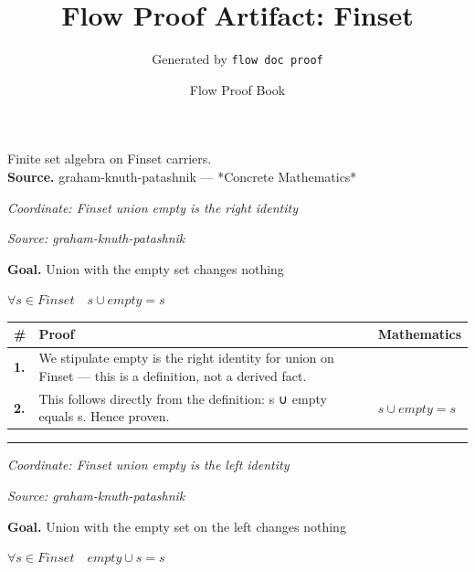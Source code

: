 \documentclass[11pt]{article}
\title{Flow Proof Artifact: Finset}
\author{Generated by \texttt{flow doc proof}}
\date{Flow Proof Book}
\theoremstyle{definition}
\begin{document}
\maketitle
Finite set algebra on Finset carriers.\\[0.5em]
\textbf{Source.} graham-knuth-patashnik — *Concrete Mathematics*\\[0.5em]
\bigskip
{}\par
\smallskip\noindent\textit{Coordinate: Finset \cdot union \cdot empty is the right identity}\par
\smallskip\noindent\textit{Source: graham-knuth-patashnik}\par
\medskip
\noindent\textbf{Goal.} Union with the empty set changes nothing\par
\noindent$\displaystyle \forall s \in Finset\quad s ∪ empty = s$\par
\medskip
\noindent
\begin{tabular}{@{} >{\raggedright\arraybackslash}p{} >{\raggedright\arraybackslash}p{} >{\raggedleft\arraybackslash}p{} @{}}
\textbf{\#} & \textbf{Proof} & \textbf{Mathematics} \\
\midrule
\textbf{1.} & We stipulate empty is the right identity for union on Finset — this is a definition, not a derived fact. & \\[0.45em]
\textbf{2.} & This follows directly from the definition: s ∪ empty equals s. Hence proven. & $\displaystyle s ∪ empty = s$ \\[0.45em]
\bottomrule
\end{tabular}
\label{thm:Finset-union-empty_is_the_right_identity}
\par\medskip\hrule
\bigskip
{}\par
\smallskip\noindent\textit{Coordinate: Finset \cdot union \cdot empty is the left identity}\par
\smallskip\noindent\textit{Source: graham-knuth-patashnik}\par
\medskip
\noindent\textbf{Goal.} Union with the empty set on the left changes nothing\par
\noindent$\displaystyle \forall s \in Finset\quad empty ∪ s = s$\par
\medskip
\end{document}
